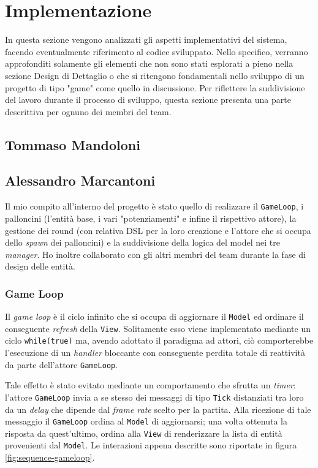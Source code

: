 \newpage
\section{Implementazione}
In questa sezione vengono analizzati gli aspetti implementativi del sistema, facendo eventualmente riferimento al codice
sviluppato. Nello specifico, verranno approfonditi solamente gli elementi che non sono stati esplorati a pieno nella
sezione Design di Dettaglio o che si ritengono fondamentali nello sviluppo di un progetto di tipo "game" come quello in
discussione. Per riflettere la suddivisione del lavoro durante il processo di sviluppo, questa sezione presenta una
parte descrittiva per ognuno dei membri del team.

\subsection{Tommaso Mandoloni}

\subsection{Alessandro Marcantoni}
Il mio compito all'interno del progetto è stato quello di realizzare il \texttt{GameLoop}, i palloncini (l'entità base,
i vari "potenziamenti" e infine il rispettivo attore), la gestione dei round (con relativa DSL per la loro creazione e
l'attore che si occupa dello \textit{spawn} dei palloncini) e la suddivisione della logica del model nei tre
\textit{manager}. Ho inoltre collaborato con gli altri membri del team durante la fase di design delle entità.

\subsubsection{Game Loop}
Il \textit{game loop} è il ciclo infinito che si occupa di aggiornare il \texttt{Model} ed ordinare il conseguente
\textit{refresh} della \texttt{View}. Solitamente esso viene implementato mediante un ciclo \texttt{while(true)} ma,
avendo adottato il paradigma ad attori, ciò comporterebbe l'esecuzione di un \textit{handler} bloccante con
conseguente perdita totale di reattività da parte dell'attore \texttt{GameLoop}.

Tale effetto è stato evitato mediante un comportamento che sfrutta un \textit{timer}: l'attore \texttt{GameLoop} invia a
se stesso dei messaggi di tipo \texttt{Tick} distanziati tra loro da un \textit{delay} che dipende dal
\textit{frame rate} scelto per la partita. Alla ricezione di tale messaggio il \texttt{GameLoop} ordina al
\texttt{Model} di aggiornarsi; una volta ottenuta la risposta da quest'ultimo, ordina alla \texttt{View} di renderizzare
la lista di entità provenienti dal \texttt{Model}. Le interazioni appena descritte sono riportate in figura
\ref{fig:sequence-gameloop}.

